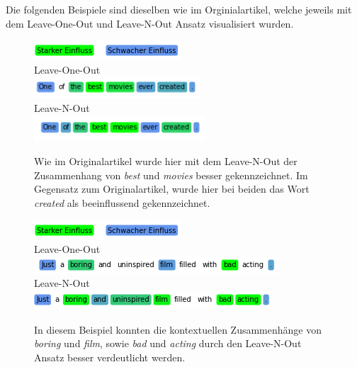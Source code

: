 \documentclass[DIV=13,fontsize=11pt]{scrartcl}
\begin{document}
Die folgenden Beispiele sind dieselben wie im Orginialartikel, welche
jeweils mit dem Leave-One-Out und Leave-N-Out Ansatz visualisiert wurden.

\begin{figure}[H]
    \centering
    \includegraphics[]{img/legend.png}\\
    Leave-One-Out\\
    \includegraphics[]{img/first_ex_loo.png}\\
    Leave-N-Out\\
    \includegraphics[]{img/first_ex_lno.png}
    \caption{Wie im Originalartikel wurde hier mit dem Leave-N-Out der Zusammenhang von \textit{best} und \textit{movies} besser gekennzeichnet. Im Gegensatz zum Originalartikel, wurde hier bei beiden das Wort \textit{created} als beeinflussend gekennzeichnet.}
    \label{fig:ex1}
\end{figure}

\begin{figure}[H]
    \centering
    \includegraphics[]{img/legend.png}\\
    Leave-One-Out\\
    \includegraphics[]{img/sec_ex_loo.png}\\
    Leave-N-Out\\
    \includegraphics[]{img/sec_ex_lno.png}
    \caption{In diesem Beispiel konnten die kontextuellen Zusammenhänge von \textit{boring} und \textit{film}, sowie \textit{bad} und \textit{acting} durch den Leave-N-Out Ansatz besser verdeutlicht werden.}
    \label{fig:ex2}
\end{figure}
\end{document}
